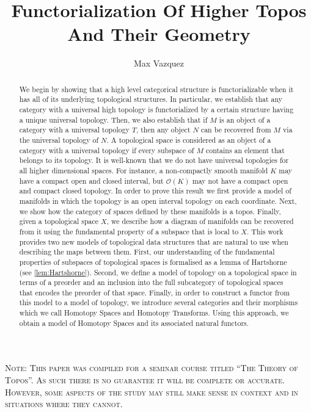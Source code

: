 \documentclass[a4paper,reqno,oneside]{article}
\begin{document}
\title{Functorialization Of Higher Topos And Their Geometry}
\author{Max Vazquez}
\maketitle


{\scshape Note: This paper was compiled for a seminar course titled ``The Theory of Topos''. As such there is no guarantee it will be complete or accurate. However, some aspects of the study may still make sense in context and in situations where they cannot.}

\vspace{-0.2cm}
\vskip 3.5cm

\begin{abstract}
    We begin by showing that a high level categorical structure is functorializable when it has all of its underlying topological structures. In particular, we establish that any category with a universal high topology is functorialized by a certain structure having a unique universal topology. Then, we also establish that if $M$ is an object of a category with a universal topology $T$, then any object $N$ can be recovered from $M$ via the universal topology of $N$. A topological space is considered as an object of a category with a universal topology if every subspace of $M$ contains an element that belongs to its topology. It is well-known that we do not have universal topologies for all higher dimensional spaces. For instance, a non-compactly smooth manifold $K$ may have a compact open and closed interval, but $\mathcal{O}(K)$ may not have a compact open and compact closed topology. In order to prove this result we first provide a model of manifolds in which the topology is an open interval topology on each coordinate. Next, we show how the category of spaces defined by these manifolds is a topos. Finally, given a topological space $X$, we describe how a diagram of manifolds can be recovered from it using the fundamental property of a subspace that is local to $X$. This work provides two new models of topological data structures that are natural to use when describing the maps between them. First, our understanding of the fundamental properties of subspaces of topological spaces is formalised as a lemma of Hartshorne (see \cref{lem:Hartshorne}). Second, we define a model of topology on a topological space in terms of a preorder and an inclusion into the full subcategory of topological spaces that encodes the preorder of that space. Finally, in order to construct a functor from this model to a model of topology, we introduce several categories and their morphisms which we call Homotopy Spaces and Homotopy Transforms. Using this approach, we obtain a model of Homotopy Spaces and its associated natural functors. 
\end{abstract}
\end{document}
